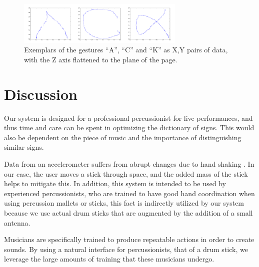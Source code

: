 \documentclass[twoside,10pt,a4paper]{article}
\begin{document}
\begin{figure}[htb]
\begin{center}
\includegraphics[width=80mm]{ack}
\end{center}
\caption{
Exemplars of the gestures ``A'', ``C'' and ``K'' as X,Y pairs of data,
with the Z axis flattened to the plane of the page.}
\label{fig:ack} 
\end{figure} 

\section{Discussion}

Our system is designed for a professional percussionist for live
performances, and thus time and care can be spent in optimizing the
dictionary of signs.  This would also be dependent on the piece of
music and the importance of distinguishing similar signs.  

Data from an accelerometer suffers from abrupt changes due to hand
shaking \cite{akl10}.  In our case, the user moves a stick through
space, and the added mass of the stick helps to mitigate this.  In
addition, this system is intended to be used by experienced
percussionists, who are trained to have good hand coordination when
using percussion mallets or sticks, this fact is indirectly utilized
by our system because we use actual drum sticks that are augmented by
the addition of a small antenna.

Musicians are specifically trained to produce repeatable actions in
order to create sounds.  By using a natural interface for
percussionists, that of a drum stick, we leverage the large amounts of
training that these musicians undergo.


 
\end{document}
